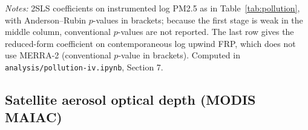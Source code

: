 \documentclass[12pt]{article}
\begin{document}
\begin{table}[H]
\centering
\caption{Pollution IV restricted to districts containing a MERRA-2 grid point}
\label{tab:owngrid}
\begin{minipage}{0.95\textwidth}
\vspace{4pt}
\footnotesize \emph{Notes:} 2SLS coefficients on instrumented log PM2.5 as in Table~\ref{tab:pollution}, with Anderson--Rubin $p$-values in brackets; because the first stage is weak in the middle column, conventional $p$-values are not reported. The last row gives the reduced-form coefficient on contemporaneous log upwind FRP, which does not use MERRA-2 (conventional $p$-value in brackets). Computed in \texttt{analysis/pollution-iv.ipynb}, Section 7.
\end{minipage}
\end{table}

\subsection{Satellite aerosol optical depth (MODIS MAIAC)}
\label{sec:maiac}
\end{document}
